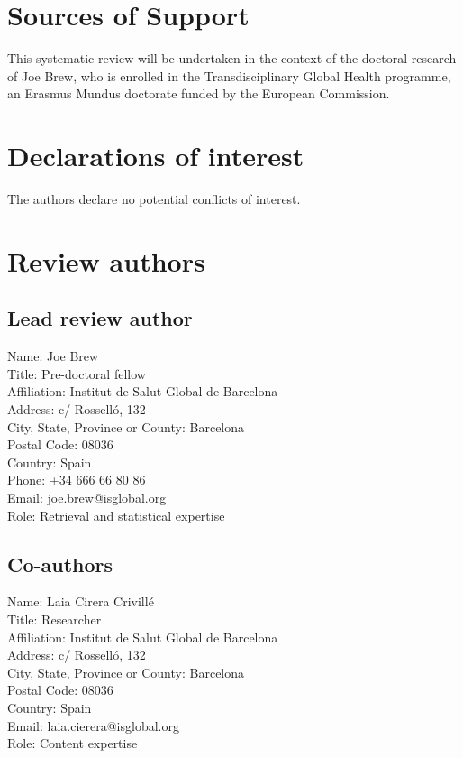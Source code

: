 \documentclass{article}
\begin{document}
\section*{Sources of Support}

This systematic review will be undertaken in the context of the doctoral research of Joe Brew, who is enrolled in the Transdisciplinary Global Health programme, an Erasmus Mundus doctorate funded by the European Commission. 

\section*{Declarations of interest}

The authors declare no potential conflicts of interest.

\section*{Review authors}

\subsection*{Lead review author}

Name: Joe Brew\\
Title: Pre-doctoral fellow\\
Affiliation: Institut de Salut Global de Barcelona\\
Address: c/ Rosselló, 132\\
City, State, Province or County: Barcelona\\
Postal Code: 08036\\
Country: Spain\\
Phone: +34 666 66 80 86\\
Email: joe.brew@isglobal.org\\
Role: Retrieval and statistical expertise


\subsection*{Co-authors}

Name: Laia Cirera Crivillé\\
Title: Researcher\\
Affiliation: Institut de Salut Global de Barcelona\\
Address: c/ Rosselló, 132\\
City, State, Province or County: Barcelona\\
Postal Code: 08036\\
Country: Spain\\
Email: laia.cierera@isglobal.org\\
Role: Content expertise
\end{document}

